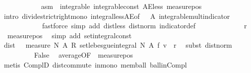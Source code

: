 \begin{isabellebody}
\ \ \ \ \ \ \ \ \ \ \isamarkupfalse%
\ asm\ {\isacharasterisk}{\kern0pt}\ integrable\ integrable{\isacharunderscore}{\kern0pt}const\ AE{\isacharunderscore}{\kern0pt}less\ measure{\isacharunderscore}{\kern0pt}pos\isanewline
\ \ \ \ \ \ \ \ \ \ \isamarkupfalse%
\ {\isacharparenleft}{\kern0pt}intro\ divide{\isacharunderscore}{\kern0pt}strict{\isacharunderscore}{\kern0pt}right{\isacharunderscore}{\kern0pt}mono\ integral{\isacharunderscore}{\kern0pt}less{\isacharunderscore}{\kern0pt}AE{\isacharbrackleft}{\kern0pt}of\ {\isacharunderscore}{\kern0pt}\ {\isacharunderscore}{\kern0pt}\ A{\isacharbrackright}{\kern0pt}\ integrable{\isacharunderscore}{\kern0pt}mult{\isacharunderscore}{\kern0pt}indicator{\isacharparenright}{\kern0pt}\isanewline
\ \ \ \ \ \ \ \ \ \ \ \ {\isacharparenleft}{\kern0pt}fastforce\ simp\ add{\isacharcolon}{\kern0pt}\ dist{\isacharunderscore}{\kern0pt}less\ dist{\isacharunderscore}{\kern0pt}norm\ indicator{\isacharunderscore}{\kern0pt}def{\isacharparenright}{\kern0pt}{\isacharplus}{\kern0pt}\isanewline
\ \ \ \ \ \ \ \ \isamarkupfalse%
\ \isamarkupfalse%
\ {\isachardoublequoteopen}{\isachardot}{\kern0pt}{\isachardot}{\kern0pt}{\isachardot}{\kern0pt}\ {\isacharequal}{\kern0pt}\ r{\isachardoublequoteclose}\ \isamarkupfalse%
\ {\isacharasterisk}{\kern0pt}\ measure{\isacharunderscore}{\kern0pt}pos\ \isamarkupfalse%
\ {\isacharparenleft}{\kern0pt}simp\ add{\isacharcolon}{\kern0pt}\ set{\isacharunderscore}{\kern0pt}integral{\isacharunderscore}{\kern0pt}const{\isacharparenright}{\kern0pt}\isanewline
\ \ \ \ \ \ \ \ \isamarkupfalse%
\ \isamarkupfalse%
\ {\isachardoublequoteopen}dist\ {\isacharparenleft}{\kern0pt}{\isacharparenleft}{\kern0pt}{}\ {\isacharslash}{\kern0pt}\ measure\ N\ A{\isacharparenright}{\kern0pt}\ {\isacharasterisk}{\kern0pt}\isactrlsub R\ set{\isacharunderscore}{\kern0pt}lebesgue{\isacharunderscore}{\kern0pt}integral\ N\ A\ f{\isacharparenright}{\kern0pt}\ v\ {\isacharless}{\kern0pt}\ r{\isachardoublequoteclose}\ \isamarkupfalse%
\ {\isacharparenleft}{\kern0pt}subst\ dist{\isacharunderscore}{\kern0pt}norm{\isacharparenright}{\kern0pt}\isanewline
\ \ \ \ \ \ \ \ \isamarkupfalse%
\ {\isachardoublequoteopen}False{\isachardoublequoteclose}\ \isamarkupfalse%
\ average{\isacharbrackleft}{\kern0pt}OF\ {\isacharasterisk}{\kern0pt}\ measure{\isacharunderscore}{\kern0pt}pos{\isacharbrackright}{\kern0pt}\ \isamarkupfalse%
\ {\isacharparenleft}{\kern0pt}metis\ ComplD\ dist{\isacharunderscore}{\kern0pt}commute\ in{\isacharunderscore}{\kern0pt}mono\ mem{\isacharunderscore}{\kern0pt}ball\ ball{\isacharunderscore}{\kern0pt}in{\isacharunderscore}{\kern0pt}Compl{\isacharparenright}{\kern0pt}\isanewline

\end{isabellebody}
